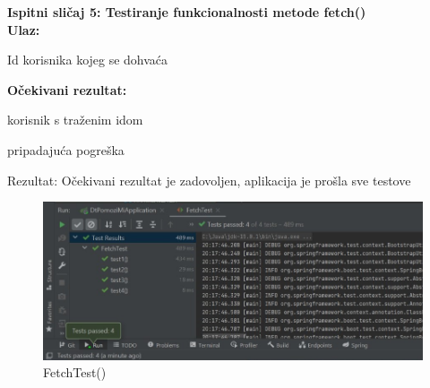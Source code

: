             \noindent \textbf{Ispitni sličaj 5: Testiranje funkcionalnosti metode fetch()}\\
			
			\medskip
            \noindent\textbf{Ulaz:}
            \begin{packed_enum}
            \item Id korisnika kojeg se dohvaća
            \end{packed_enum}
            
            \noindent\textbf{Očekivani rezultat:}
            \begin{packed_enum}
            \item korisnik s traženim idom
            \item pripadajuća pogreška
            \end{packed_enum}
            
            \noindent \text
            Rezultat: Očekivani rezultat je zadovoljen, aplikacija je prošla sve testove \\
            
            \begin{figure}[H]
                 \includegraphics[width=\textwidth, height=\textheight, keepaspectratio]{slike/FetchTest.jpeg}
                \cntering
                \caption{FetchTest()}
            \end{figure}
            
